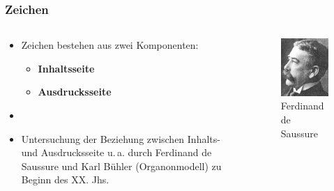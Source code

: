 \begin{frame} \frametitle{Zeichen}

\begin{columns}
	
\begin{column}{.5\textwidth}

\begin{itemize}
	\item Zeichen bestehen aus zwei Komponenten:
	
	\begin{itemize}
		\item \textbf{Inhaltsseite}
		\item \textbf{Ausdrucksseite}
	\end{itemize}
	
	\item[]
	
	\item Untersuchung der Beziehung zwischen Inhalts- und Ausdrucksseite u.\,a. durch Ferdinand de Saussure und Karl Bühler (Organonmodell) zu Beginn des XX. Jhs.
	
\end{itemize}

\end{column}
\begin{column}{.5\textwidth}

\begin{figure}
	\begin{center}
		\includegraphics[scale=.3]{material/Ferdinand_de_Saussure}	
	\end{center}
	
	\caption{Ferdinand de Saussure}	
\end{figure}
	
\end{column}

\end{columns}

\end{frame}


